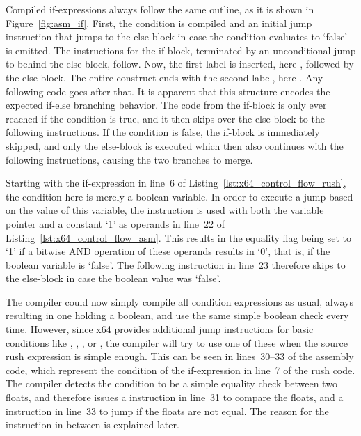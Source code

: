 Compiled if-expressions always follow the same outline, as it is shown in Figure~\ref{fig:asm_if}.
First, the condition is compiled and an initial jump instruction that jumps to the else-block in case the condition evaluates to `false' is emitted.
The instructions for the if-block, terminated by an unconditional jump to behind the else-block, follow.
Now, the first label is inserted, here , followed by the else-block.
The entire construct ends with the second label, here .
Any following code goes after that.
It is apparent that this structure encodes the expected if-else branching behavior.
The code from the if-block is only ever reached if the condition is true, and it then skips over the else-block to the following instructions.
If the condition is false, the if-block is immediately skipped, and only the else-block is executed which then also continues with the following instructions, causing the two branches to merge.

Starting with the if-expression in line~6 of Listing~\ref{lst:x64_control_flow_rush}, the condition here is merely a boolean variable.
In order to execute a jump based on the value of this variable, the  instruction is used with both the variable pointer and a constant `1' as operands in line~22 of Listing~\ref{lst:x64_control_flow_asm}.
This results in the equality flag being set to `1' if a bitwise AND operation of these operands results in `0', that is, if the boolean variable is `false'.
The following  instruction in line~23 therefore skips to the else-block in case the boolean value was `false'.

The compiler could now simply compile all condition expressions as usual, always resulting in one  holding a boolean, and use the same simple boolean check every time.
However, since x64 provides additional jump instructions for basic conditions like \qVerb{==}, \qVerb{!=}, \qVerb{>=}, or \qVerb{<}, the compiler will try to use one of these when the source rush expression is simple enough.
This can be seen in lines~30--33 of the assembly code, which represent the condition of the if-expression in line~7 of the rush code.
The compiler detects the condition to be a simple equality check between two floats, and therefore issues a  instruction in line~31 to compare the floats, and a  instruction in line~33 to jump if the floats are not equal.
The reason for the \label{x64_ucomisd} instruction in between is explained later.

